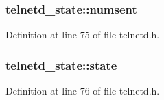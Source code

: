 \hypertarget{group__apps_gad85fc90c30d1fc37c63c4844be5fe09d}{
\subsubsection[{numsent}]{ {\bf telnetd\_\-state::numsent}}}
\label{group__apps_gad85fc90c30d1fc37c63c4844be5fe09d}


Definition at line 75 of file telnetd.h.

\hypertarget{group__apps_ga41bf109b6a45328d5744c0a76563fb6c}{
\subsubsection[{state}]{ {\bf telnetd\_\-state::state}}}
\label{group__apps_ga41bf109b6a45328d5744c0a76563fb6c}


Definition at line 76 of file telnetd.h.

